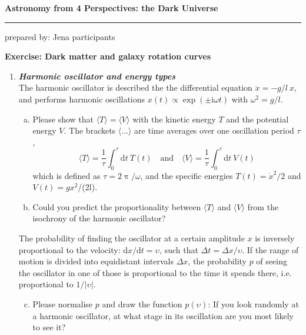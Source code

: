 \documentclass[a4paper,12pt]{article}
\newcommand{\question}[1]{\textbf{\textit{#1}}}
\newcommand{\HRule}{\rule{\linewidth}{0.3mm}}
\newcommand{\dd}{\mathrm{d}}
\renewcommand{\pi}{\uppi}
\newcommand{\ci}{\mathrm{i}}
\newcommand{\bra}{\langle}
\newcommand{\ket}{\rangle}
\begin{document}
\pagestyle{empty}

\begin{center}
\LARGE \textbf{Astronomy from 4 Perspectives: the Dark Universe}
\HRule
\end{center}
\begin{flushright}
prepared by: Jena participants
\end{flushright}
\begin{center}
{\Large \textbf{Exercise: Dark matter and galaxy rotation curves}}
\end{center}
\vspace{5mm}

\begin{enumerate}


\item \question{Harmonic oscillator and energy types}\\
The harmonic oscillator is described the the differential equation $\ddot{x} = -g/l\: x$, and performs harmonic oscillations $x(t)\propto\exp(\pm\ci\omega t)$ with $\omega^2 = g/l$.
\begin{enumerate}[(a)]
\item{Please show that $\bra T\ket = \bra V\ket$ with the kinetic energy $T$ and the potential energy $V$. The brackets $\bra\ldots\ket$ are time averages over one oscillation period $\tau$,
\begin{equation}
\bra T\ket = \frac{1}{\tau}\int_0^\tau\dd t\:T(t)
\quad\mathrm{and}\quad
\bra V\ket = \frac{1}{\tau}\int_0^\tau\dd t\:V(t)
\end{equation}
which is defined as $\tau = 2\pi/\omega$, and the specific energies $T(t) = \dot{x}^2/2$ and $V(t) = gx^2$/(2l).}
\item{Could you predict the proportionality between $\bra T\ket$ and $\bra V\ket$ from the isochrony of the harmonic oscillator?}
\end{enumerate}
The probability of finding the oscillator at a certain amplitude $x$ is inversely proportional to the velocity: $\dd x/\dd t = \upsilon$, such that $\Delta t = \Delta x/\upsilon$. If the range of motion is divided into equidistant intervals $\Delta x$, the probability $p$ of seeing the oscillator in one of those is proportional to the time it spends there, i.e. proportional to $1/\left|\upsilon\right|$.
\begin{enumerate}[(a)]
\setcounter{enumii}{2}
\item{Please normalise $p$ and draw the function $p(\upsilon)$: If you look randomly at a harmonic oscillator, at what stage in its oscillation are you most likely to see it?}

\end{enumerate}
\end{enumerate}
\end{document}
